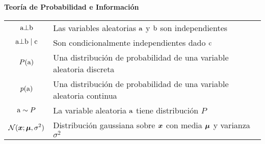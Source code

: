 \vspace{\notationgap}
\begin{minipage}{\textwidth}
\centerline{\bf Teoría de Probabilidad e Información}
\bgroup
\def\arraystretch{1.5}
\begin{tabular}{cp{3.25in}}
$\displaystyle {\textnormal{a}} \bot {\textnormal{b}}$ & Las variables aleatorias ${\textnormal{a}}$ y ${\textnormal{b}}$ son independientes\\
$\displaystyle {\textnormal{a}} \bot {\textnormal{b}} \mid {\textnormal{c}} $ & Son condicionalmente independientes dado ${\textnormal{c}}$\\
$\displaystyle P({\textnormal{a}})$ & Una distribución de probabilidad de una variable aleatoria discreta\\
$\displaystyle p({\textnormal{a}})$ & Una distribución de probabilidad de una variable aleatoria continua\\
$\displaystyle {\textnormal{a}} \sim P$ & La variable aleatoria ${\textnormal{a}}$ tiene distribución $P$\\%
$\displaystyle \mathcal{N} ( {\bm{x}} ; {\bm{\mu}} , \sigma^2)$ & Distribución gaussiana %
sobre ${\bm{x}}$ con media ${\bm{\mu}}$ y varianza $\sigma^2$ \\
\end{tabular}
\egroup
{}
\end{minipage}


